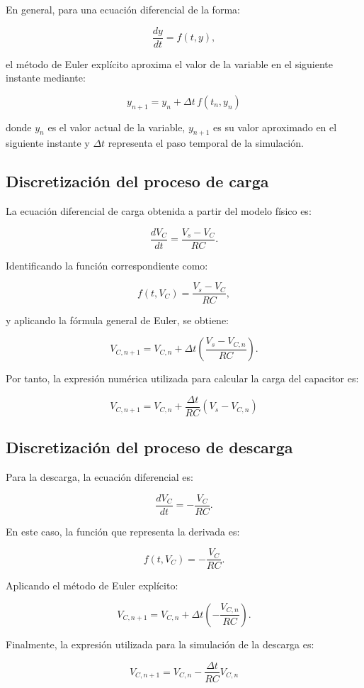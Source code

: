 \documentclass[11pt,a4paper]{article}
\begin{document}
En general, para una ecuación diferencial de la forma:

\[
\frac{dy}{dt}=f(t,y),
\]

el método de Euler explícito aproxima el valor de la variable
en el siguiente instante mediante:

\[
\boxed{
y_{n+1}=y_n+\Delta t\,f(t_n,y_n)
}
\]

donde $y_n$ es el valor actual de la variable, $y_{n+1}$ es
su valor aproximado en el siguiente instante y $\Delta t$
representa el paso temporal de la simulación.

\subsection{Discretización del proceso de carga}

La ecuación diferencial de carga obtenida a partir del modelo
físico es:

\[
\frac{dV_C}{dt}=\frac{V_s-V_C}{RC}.
\]

Identificando la función correspondiente como:

\[
f(t,V_C)=\frac{V_s-V_C}{RC},
\]

y aplicando la fórmula general de Euler, se obtiene:

\[
V_{C,n+1}=V_{C,n}+
\Delta t\left(\frac{V_s-V_{C,n}}{RC}\right).
\]

Por tanto, la expresión numérica utilizada para calcular la
carga del capacitor es:

\[
\boxed{
V_{C,n+1}=V_{C,n}+
\frac{\Delta t}{RC}(V_s-V_{C,n})
}
\]

\subsection{Discretización del proceso de descarga}

Para la descarga, la ecuación diferencial es:

\[
\frac{dV_C}{dt}=-\frac{V_C}{RC}.
\]

En este caso, la función que representa la derivada es:

\[
f(t,V_C)=-\frac{V_C}{RC}.
\]

Aplicando el método de Euler explícito:

\[
V_{C,n+1}=V_{C,n}+
\Delta t\left(-\frac{V_{C,n}}{RC}\right).
\]

Finalmente, la expresión utilizada para la simulación de la
descarga es:

\[
\boxed{
V_{C,n+1}=V_{C,n}-
\frac{\Delta t}{RC}V_{C,n}
}
\]
\end{document}
